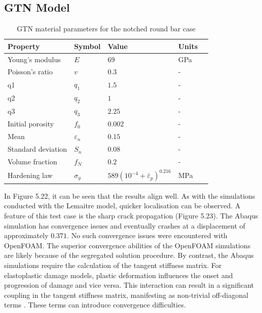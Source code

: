 \documentclass[sn-mathphys,Numbered,draft]{sn-jnl}%
\begin{document}
\subsection{GTN Model}

\begin{table}[htb]
	\centering
		\begin{tabular}{lllll} \hline
		    Property & Symbol & Value & Units  \\ \hline 
		    Young's modulus & $E$ & $69$ & GPa \\
		    Poisson's ratio & $v$ & $0.3$   & - \\
		    q1 & $q_1$ & $1.5$  & -\\
		    q2 & $q_2$ & $1$  & -\\
		    q3 & $q_3$ & $2.25$  & -\\
		    Initial porosity & $f_0$ & $0.002$  &  -\\
		    Mean & $\varepsilon_n$ & $0.15$  &  -\\
		    Standard deviation & $S_n$ & $0.08$  &  -\\
		    Volume fraction & $f_N$ & $0.2$  & -\\
		    Hardening law & $\sigma_y$ & $589({10^{-4}+\bar{\varepsilon}}_p)^{0.216}$ & MPa  \\
		\hline
		\end{tabular}
	\caption{GTN material parameters for the notched round bar case}
	\label{table:NRB_material_properties_GTN}
\end{table}


In Figure 5.22, it can be seen that the results align well.
As with the simulations conducted with the Lemaitre model, quicker localisation can be observed.
A feature of this test case is the sharp crack propagation (Figure 5.23).
The Abaqus simulation has convergence issues and eventually crashes at a displacement of approximately $0.371$.
No such convergence issues were encountered with OpenFOAM.
The superior convergence abilities of the OpenFOAM simulations are likely because of the segregated solution procedure.
By contrast, the Abaqus simulations require the calculation of the tangent stiffness matrix.
For elastoplastic damage models, plastic deformation influences the onset and progression of damage and vice versa.
This interaction can result in a significant coupling in the tangent stiffness matrix, manifesting as non-trivial off-diagonal terms \cite{bathe_finite_1996}.
These terms can introduce convergence difficulties.
\end{document}
